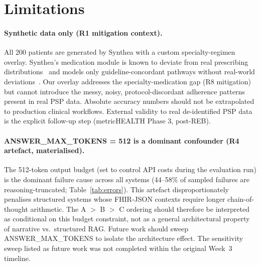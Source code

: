 
\section{Limitations}
\label{sec:limitations}

\paragraph{Synthetic data only (R1 mitigation context).}
All 200 patients are generated by Synthea with a custom specialty-regimen overlay.
Synthea's medication module is known to deviate from real prescribing
distributions~\citep{hodges2023medication} and models only guideline-concordant
pathways without real-world deviations~\citep{meeker2022synthea}.
Our overlay addresses the specialty-medication gap (R8 mitigation) but cannot
introduce the messy, noisy, protocol-discordant adherence patterns present in real
PSP data.  Absolute accuracy numbers should not be extrapolated to production
clinical workflows.  External validity to real de-identified PSP data is the explicit
follow-up step (metricHEALTH Phase 3, post-REB).

\paragraph{ANSWER\_MAX\_TOKENS = 512 is a dominant confounder (R4 artefact, materialised).}
The 512-token output budget (set to control API costs during the evaluation run)
is the dominant failure cause across all systems (44--58\% of sampled failures are
reasoning-truncated; Table~\ref{tab:errors}).  This artefact disproportionately
penalises structured systems whose FHIR-JSON contexts require longer chain-of-thought
arithmetic.  The A $>$ B $>$ C ordering should therefore be interpreted as conditional
on this budget constraint, not as a general architectural property of narrative vs.\
structured RAG.  Future work should sweep ANSWER\_MAX\_TOKENS to isolate the
architecture effect.  The sensitivity sweep listed as future work was not
completed within the original Week~3 timeline.

